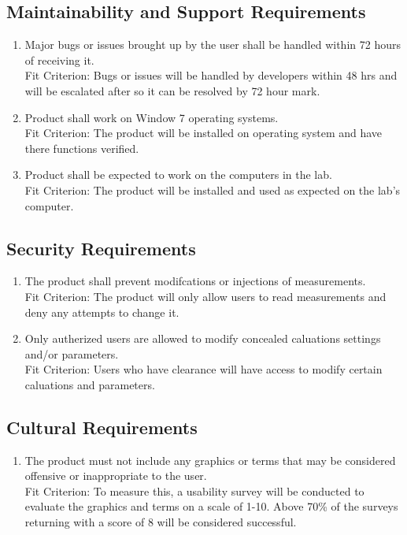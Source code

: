 \documentclass[12pt, titlepage]{article}
\begin{document}
\subsection{Maintainability and Support Requirements}
\begin{adjustwidth}{2.2em}{0pt}
\begin{enumerate}[{NFR-M}1.] 
  \item Major bugs or issues brought up by the user shall be handled within 72 hours of receiving it.\\
  Fit Criterion: Bugs or issues will be handled by developers within 48 hrs and will be escalated after so it can be resolved by 72 hour mark.
  \item Product shall work on Window 7 operating systems.\\
  Fit Criterion: The product will be installed on operating system and have there functions verified.
  \item Product shall be expected to work on the computers in the lab.\\
  Fit Criterion: The product will be installed and used as expected on the lab's computer.
\end{enumerate} 
\end{adjustwidth}

\subsection{Security Requirements}
\begin{adjustwidth}{2.0em}{0pt}
\begin{enumerate}[{NFR-S}1.]
  \item The product shall prevent modifcations or injections of measurements.\\
  Fit Criterion: The product will only allow users to read measurements and deny any attempts to change it.
  \item Only autherized users are allowed to modify concealed caluations settings and/or parameters.\\
  Fit Criterion: Users who have clearance will have access to modify certain caluations and parameters.
\end{enumerate}
\end{adjustwidth}

\subsection{Cultural Requirements}
\begin{adjustwidth}{2.2em}{0pt}
\begin{enumerate}[{NFR-C}1.]
    \item The product must not include any graphics or terms that may be considered offensive or inappropriate to the user.\\
    Fit Criterion: To measure this, a usability survey will be conducted to evaluate the graphics and terms on a scale of 1-10. Above 70\% of the surveys returning with a score of 8 will be considered successful.
\end{enumerate}
\end{adjustwidth}
\end{document}
